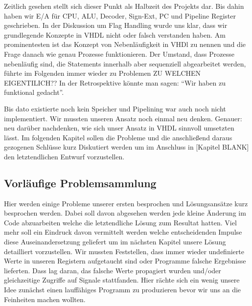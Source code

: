 \documentclass[paper=a4,fontsize=12pt,twocolumn]{scrreprt}
\begin{document}
Zeitlich gesehen stellt sich dieser Punkt als Halbzeit des Projekts dar.
Bis dahin haben wir E/A für CPU, ALU, Decoder, Sign-Ext, PC und Pipeline Register geschrieben.
In der Diskussion um Flag Handling wurde uns klar, dass wir grundlegende Konzepte in VHDL nicht oder falsch verstanden haben.
Am prominentesten ist das Konzept von Nebenläufigkeit in VHDl zu nennen und die Frage danach wie genau Prozesse funktionieren.
Der Umstand, dass Prozesse nebenläufig sind, die Statements innerhalb aber sequenziell abgearbeitet werden, führte im Folgenden immer wieder zu Problemen {\color{red}ZU WELCHEN EIGENTILICH??}
In der Retrospektive könnte man sagen: \enquote{Wir haben zu funktional gedacht}.





Bis dato existierte noch kein Speicher und Pipelining war auch noch nicht implementiert.
Wir mussten unseren Ansatz noch einmal neu denken. Genauer: neu darüber nachdenken, wie sich unser Ansatz in VHDL sinnvoll umsetzten lässt.
Im folgenden Kapitel sollen die Probleme und die anschließend daraus gezogenen Schlüsse kurz Diskutiert werden um im Anschluss in [Kapitel BLANK] den letztendlichen Entwurf vorzustellen. 

\subsection{Vorläufige Problemsammlung}



Hier werden einige Probleme unserer ersten besprochen und Lösungsansätze kurz besprochen werden. Dabei soll davon abgesehen werden jede kleine Änderung im Code abzuarbeiten welche die letztendliche Lösung zum Resultat hatten. Viel mehr soll ein Eindruck davon vermittelt werden welche entscheidenden Impulse diese Auseinandersetzung geliefert um im nächsten Kapitel unsere Lösung detailliert vorzustellen.
Wir mussten Feststellen, dass immer wieder undefinierte Werte in unseren Registern aufgetaucht sind oder Programme falsche Ergebnisse lieferten.
    Dass lag daran, das falsche Werte propagiert wurden und/oder gleichzeitige Zugriffe auf Signale stattfanden.
    Hier rächte sich ein wenig unsere Idee zunächst einen lauffähiges Programm zu produzieren bevor wir uns an die Feinheiten machen wollten.
\end{document}
